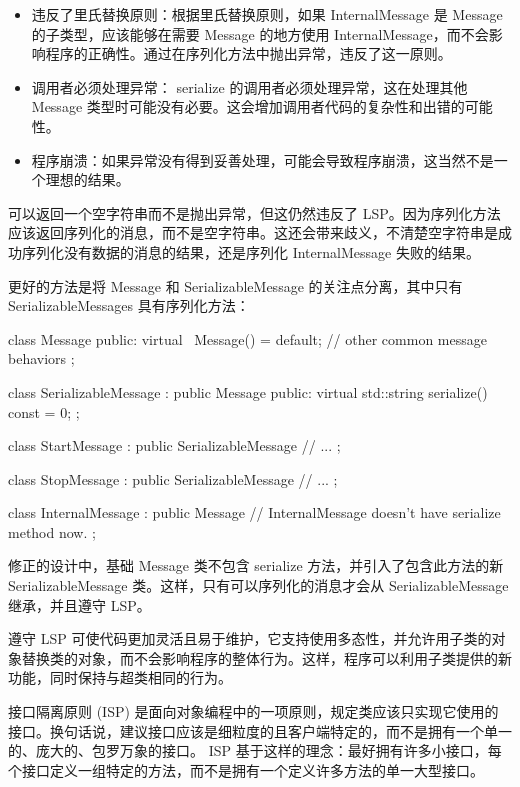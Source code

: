 \begin{itemize}
\item
违反了里氏替换原则：根据里氏替换原则，如果 InternalMessage 是 Message 的子类型，应该能够在需要 Message 的地方使用 InternalMessage，而不会影响程序的正确性。通过在序列化方法中抛出异常，违反了这一原则。

\item
调用者必须处理异常： serialize 的调用者必须处理异常，这在处理其他 Message 类型时可能没有必要。这会增加调用者代码的复杂性和出错的可能性。

\item
程序崩溃：如果异常没有得到妥善处理，可能会导致程序崩溃，这当然不是一个理想的结果。
\end{itemize}

可以返回一个空字符串而不是抛出异常，但这仍然违反了 LSP。因为序列化方法应该返回序列化的消息，而不是空字符串。这还会带来歧义，不清楚空字符串是成功序列化没有数据的消息的结果，还是序列化 InternalMessage 失败的结果。

更好的方法是将 Message 和 SerializableMessage 的关注点分离，其中只有 SerializableMessages 具有序列化方法：

\begin{cpp}
class Message {
public:
    virtual ~Message() = default;
    // other common message behaviors
};

class SerializableMessage : public Message {
public:
    virtual std::string serialize() const = 0;
};

class StartMessage : public SerializableMessage {
    // ...
};

class StopMessage : public SerializableMessage {
    // ...
};

class InternalMessage : public Message {
    // InternalMessage doesn't have serialize method now.
};
\end{cpp}

修正的设计中，基础 Message 类不包含 serialize 方法，并引入了包含此方法的新 SerializableMessage 类。这样，只有可以序列化的消息才会从 SerializableMessage 继承，并且遵守 LSP。

遵守 LSP 可使代码更加灵活且易于维护，它支持使用多态性，并允许用子类的对象替换类的对象，而不会影响程序的整体行为。这样，程序可以利用子类提供的新功能，同时保持与超类相同的行为。


接口隔离原则 (ISP) 是面向对象编程中的一项原则，规定类应该只实现它使用的接口。换句话说，建议接口应该是细粒度的且客户端特定的，而不是拥有一个单一的、庞大的、包罗万象的接口。 ISP 基于这样的理念：最好拥有许多小接口，每个接口定义一组特定的方法，而不是拥有一个定义许多方法的单一大型接口。

